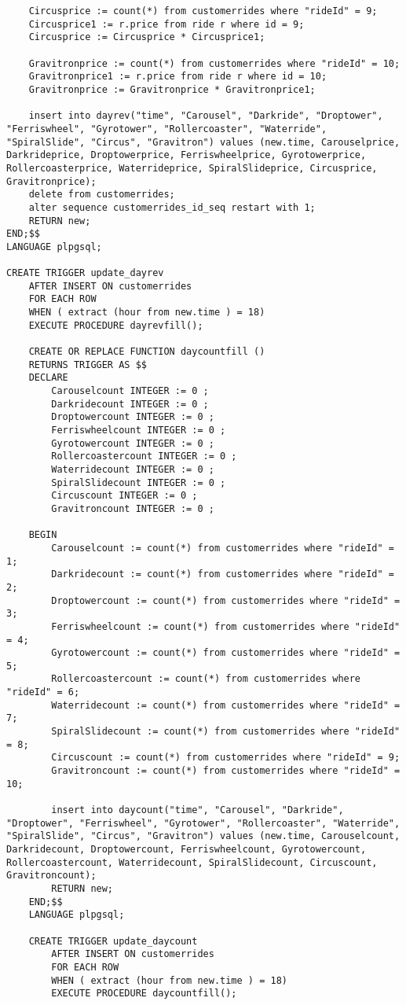 \begin{verbatim}
    Circusprice := count(*) from customerrides where "rideId" = 9;
    Circusprice1 := r.price from ride r where id = 9;
    Circusprice := Circusprice * Circusprice1;

    Gravitronprice := count(*) from customerrides where "rideId" = 10;
    Gravitronprice1 := r.price from ride r where id = 10;
    Gravitronprice := Gravitronprice * Gravitronprice1;

    insert into dayrev("time", "Carousel", "Darkride", "Droptower", "Ferriswheel", "Gyrotower", "Rollercoaster", "Waterride", "SpiralSlide", "Circus", "Gravitron") values (new.time, Carouselprice, Darkrideprice, Droptowerprice, Ferriswheelprice, Gyrotowerprice, Rollercoasterprice, Waterrideprice, SpiralSlideprice, Circusprice, Gravitronprice);
    delete from customerrides;
    alter sequence customerrides_id_seq restart with 1;
    RETURN new;
END;$$
LANGUAGE plpgsql;

CREATE TRIGGER update_dayrev
    AFTER INSERT ON customerrides
    FOR EACH ROW
    WHEN ( extract (hour from new.time ) = 18)
    EXECUTE PROCEDURE dayrevfill();

    CREATE OR REPLACE FUNCTION daycountfill ()
    RETURNS TRIGGER AS $$
    DECLARE
        Carouselcount INTEGER := 0 ;
        Darkridecount INTEGER := 0 ;
        Droptowercount INTEGER := 0 ;
        Ferriswheelcount INTEGER := 0 ;
        Gyrotowercount INTEGER := 0 ;
        Rollercoastercount INTEGER := 0 ;
        Waterridecount INTEGER := 0 ;
        SpiralSlidecount INTEGER := 0 ;
        Circuscount INTEGER := 0 ;
        Gravitroncount INTEGER := 0 ;

    BEGIN
        Carouselcount := count(*) from customerrides where "rideId" = 1;
        Darkridecount := count(*) from customerrides where "rideId" = 2;
        Droptowercount := count(*) from customerrides where "rideId" = 3;
        Ferriswheelcount := count(*) from customerrides where "rideId" = 4;
        Gyrotowercount := count(*) from customerrides where "rideId" = 5;
        Rollercoastercount := count(*) from customerrides where "rideId" = 6;
        Waterridecount := count(*) from customerrides where "rideId" = 7;
        SpiralSlidecount := count(*) from customerrides where "rideId" = 8;
        Circuscount := count(*) from customerrides where "rideId" = 9;
        Gravitroncount := count(*) from customerrides where "rideId" = 10;

        insert into daycount("time", "Carousel", "Darkride", "Droptower", "Ferriswheel", "Gyrotower", "Rollercoaster", "Waterride", "SpiralSlide", "Circus", "Gravitron") values (new.time, Carouselcount, Darkridecount, Droptowercount, Ferriswheelcount, Gyrotowercount, Rollercoastercount, Waterridecount, SpiralSlidecount, Circuscount, Gravitroncount);
        RETURN new;
    END;$$
    LANGUAGE plpgsql;

    CREATE TRIGGER update_daycount
        AFTER INSERT ON customerrides
        FOR EACH ROW
        WHEN ( extract (hour from new.time ) = 18)
        EXECUTE PROCEDURE daycountfill();
\end{verbatim}

